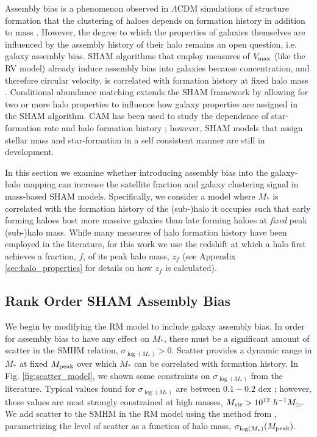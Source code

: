 \documentclass[a4paper,fleqn,usenatbib]{mnras}
\begin{document}
Assembly bias is a phenomenon observed in $\Lambda$CDM simulations of structure formation that the clustering of haloes depends on formation history in addition to mass \citep{Gao:2005ds, Wechsler:2006rg, Gao:2007yy, li:2008oi, Sunayama:2015ue}.  However, the degree to which the properties of galaxies themselves are influenced by the assembly history of their halo remains an open question, i.e. galaxy assembly bias.  SHAM algorithms that employ measures of $V_{\rm max}$ (like the RV model) already induce assembly bias into galaxies because concentration, and therefore circular velocity, is correlated with formation history at fixed halo mass \citep{Zentner:2014ki}.  Conditional abundance matching \citep[CAM,][]{Hearin:2014hh} extends the SHAM framework by allowing for two or more halo properties to influence how galaxy properties are assigned in the SHAM algorithm.  CAM has been used to study the dependence of star-formation rate and halo formation history \citep{Hearin:2013km, Hearin:2014hh, Watson:2015gq, Saito:2015vi, Paranjape:2015uy}; however, SHAM models that assign stellar mass and star-formation in a self consistent manner are still in development.

In this section we examine whether introducing assembly bias into the galaxy-halo mapping can increase the satellite fraction and galaxy clustering signal in mass-based SHAM models.  Specifically, we consider a model where $M_{*}$ is correlated with the formation history of the (sub-)halo it occupies such that early forming haloes host more massive galaxies than late forming haloes at {\em fixed} peak (sub-)halo mass.  While many measures of halo formation history have been employed in the literature, for this work we use the redshift at which a halo first achieves a fraction, $f$, of its peak halo mass, $z_{f}$ (see Appendix \ref{sec:halo_properties} for details on how $z_{f}$ is calculated).


\subsection{Rank Order SHAM Assembly Bias}

We begin by modifying the RM model to include galaxy assembly bias.  In order for assembly bias to have any effect on $M_*$, there must be a significant amount of scatter in the SMHM relation, $\sigma_{\log(M_*)} >0$.  Scatter provides a dynamic range in $M_*$ at fixed $M_{\rm peak}$ over which $M_*$ can be correlated with formation history.  In Fig. \ref{fig:scatter_model}, we shown some constraints on $\sigma_{\log(M_*)}$ from the literature.   Typical values found for $\sigma_{\log(M_*)}$ are between $0.1-0.2$ dex \citep{More:2011il, Reddick:2013gi, Zu:2015vh, Tinker:2016vu}; however, these values are most strongly constrained at high masses, $M_{\rm vir}>10^{12}~h^{-1}M_{\odot}$.  We add scatter to the SMHM in the RM model using the method from \citet{Behroozi:2010ja}, parametrizing the level of scatter as a function of halo mass, $\sigma_{\log(M_*)}(M_{\rm peak})$.   
\end{document}
